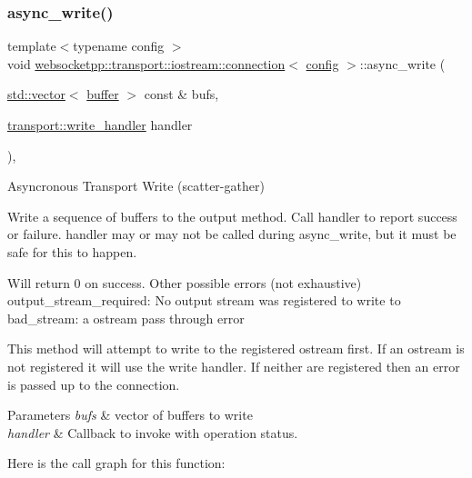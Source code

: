 \subsubsection{\texorpdfstring{async\+\_\+write()}{async\_write()}\hspace{0.1cm}{\footnotesize\ttfamily [2/2]}}
{\footnotesize\ttfamily template$<$typename config $>$ \\
void \mbox{\hyperlink{classwebsocketpp_1_1transport_1_1iostream_1_1connection}{websocketpp\+::transport\+::iostream\+::connection}}$<$ \mbox{\hyperlink{classconfig}{config}} $>$\+::async\+\_\+write (\begin{DoxyParamCaption}\item[{\mbox{\hyperlink{classstd_1_1vector}{std\+::vector}}$<$ \mbox{\hyperlink{structwebsocketpp_1_1transport_1_1buffer}{buffer}} $>$ const \&}]{bufs,  }\item[{\mbox{\hyperlink{namespacewebsocketpp_1_1transport_addf5d728159e7aa2bce2a0df947b1560}{transport\+::write\+\_\+handler}}}]{handler }\end{DoxyParamCaption})\hspace{0.3cm}{\ttfamily [inline]}, {\ttfamily [protected]}}



Asyncronous Transport Write (scatter-\/gather) 

Write a sequence of buffers to the output method. Call handler to report success or failure. handler may or may not be called during async\+\_\+write, but it must be safe for this to happen.

Will return 0 on success. Other possible errors (not exhaustive) output\+\_\+stream\+\_\+required\+: No output stream was registered to write to bad\+\_\+stream\+: a ostream pass through error

This method will attempt to write to the registered ostream first. If an ostream is not registered it will use the write handler. If neither are registered then an error is passed up to the connection.


\begin{DoxyParams}{Parameters}
{\em bufs} & vector of buffers to write \\
\hline
{\em handler} & Callback to invoke with operation status. \\
\hline
\end{DoxyParams}
Here is the call graph for this function\+:
\mbox{\label{classwebsocketpp_1_1transport_1_1iostream_1_1connection_a0c31a1546701021f547ae2f21126a473}} 
